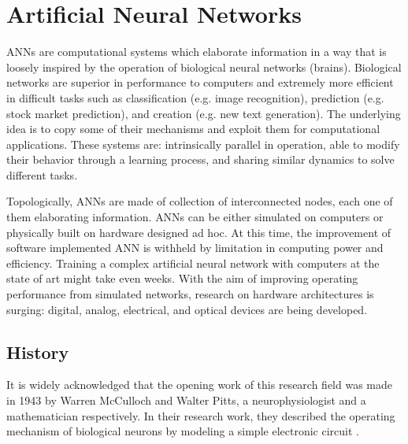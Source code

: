 \chapter{Artificial Neural Networks}
\label{ch:Artificial_Neural_Networks}

\acfp{ANN} are computational systems which elaborate information in a way that is loosely inspired by the operation of biological neural networks (brains).
Biological networks are superior in performance to computers and extremely more efficient in difficult tasks such as classification (e.g. image recognition), prediction (e.g. stock market prediction), and creation (e.g. new text generation).
The underlying idea is to copy some of their mechanisms and exploit them for computational applications.
These systems are: intrinsically parallel in operation, able to modify their behavior through a learning process, and sharing similar dynamics to solve different tasks.

Topologically, \acsp{ANN} are made of collection of interconnected nodes, each one of them elaborating information.
\acsp{ANN} can be either simulated on computers or physically built on hardware designed ad hoc.
At this time, the improvement of software implemented ANN is withheld by limitation in computing power and efficiency.
Training a complex artificial neural network with computers at the state of art might take even weeks.
With the aim of improving operating performance from simulated networks, research on hardware architectures is surging: digital, analog, electrical, and optical devices are being developed.

\section{History}
\label{sec:History}
It is widely acknowledged that the opening work of this research field was made in 1943 by Warren McCulloch and Walter Pitts, a neurophysiologist and a mathematician respectively.
In their research work, they described the operating mechanism of biological neurons by modeling a simple electronic circuit \cite{McCulloch1943}.

